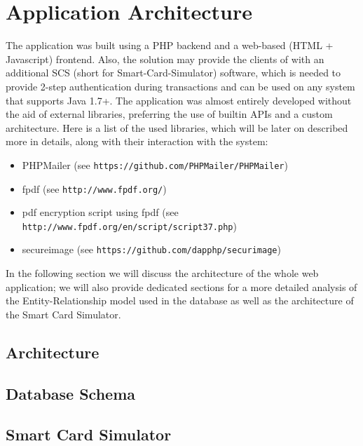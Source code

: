\chapter{Application Architecture}\label{chapter:application_architecture}
The \gnb{} application was built using a PHP backend and a web-based (HTML + Javascript) frontend. Also, the solution may provide the clients of \gnb{} with an additional SCS (short for Smart-Card-Simulator) software, which is needed to provide 2-step authentication during transactions and can be used on any system that supports Java 1.7+.\newline
The application was almost entirely developed without the aid of external libraries, preferring the use of builtin APIs and a custom architecture. Here is a list of the used libraries, which will be later on described more in details, along with their interaction with the system:
\begin{itemize}
	\item PHPMailer (see \texttt{https://github.com/PHPMailer/PHPMailer})
	\item fpdf (see \texttt{http://www.fpdf.org/})
	\item pdf encryption script using fpdf (see \texttt{http://www.fpdf.org/en/script/script37.php})
	\item secureimage (see \texttt{https://github.com/dapphp/securimage})
\end{itemize}

In the following section we will discuss the architecture of the whole web application; we will also provide dedicated sections for a more detailed analysis of the Entity-Relationship model used in the database as well as the architecture of the Smart Card Simulator.
\section{Architecture}

\section{Database Schema}

\section{Smart Card Simulator}
